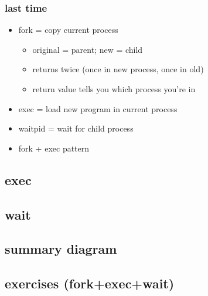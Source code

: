 \date{}
\title{}
\date{}

\begin{frame}
    \titlepage
\end{frame}



\usetikzlibrary{patterns}

\begin{frame}
\frametitle{last time}
\begin{itemize}
\item fork = copy current process
    \begin{itemize}
    \item original = parent; new = child
    \item returns twice (once in new process, once in old)
    \item return value tells you which process you're in
    \end{itemize}
\item exec = load new program in current process
\item waitpid = wait for child process
\item fork + exec pattern
\end{itemize}
\end{frame}





\subsection{exec} 



\subsection{wait}





\subsection{summary diagram}




\subsection{exercises (fork+exec+wait)}

